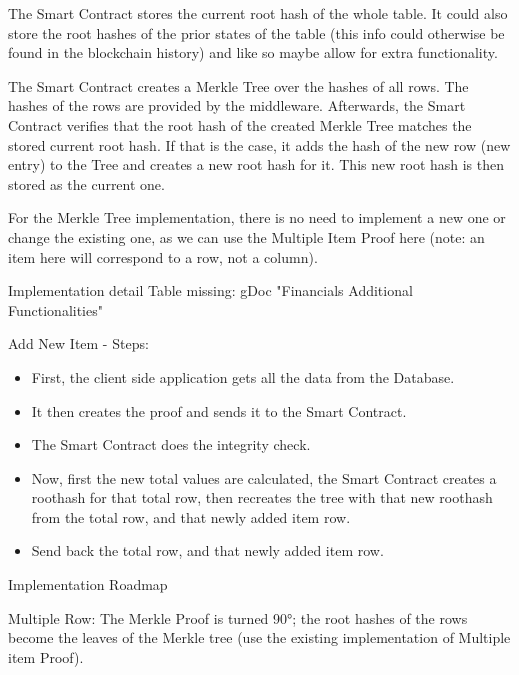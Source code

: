 The Smart Contract stores the current root hash of the whole table. It could also store the root hashes of the prior states of the table (this info could otherwise be found in the blockchain history) and like so maybe allow for extra functionality.

The Smart Contract creates a Merkle Tree over the hashes of all rows. The hashes of the rows are provided by the middleware. Afterwards, the Smart Contract verifies that the root hash of the created Merkle Tree matches the stored current root hash. If that is the case, it adds the hash of the new row (new entry) to the Tree and creates a new root hash for it. This new root hash is then stored as the current one.

For the Merkle Tree implementation, there is no need to implement a new one or change the existing one, as we can use the Multiple Item Proof here (note: an item here will correspond to a row, not a column).

Implementation detail
Table missing: gDoc "Financials Additional Functionalities"

Add New Item - Steps:
\begin{itemize}
\item First, the client side application gets all the data from the Database.
\item It then creates the proof and sends it to the Smart Contract.
\item The Smart Contract does the integrity check.
\item Now, first the new total values are calculated, the Smart Contract creates a roothash for that total row, then recreates the tree with that new roothash from the total row, and that newly added item row.
\item Send back the total row, and that newly added item row.
\end{itemize}

Implementation Roadmap

Multiple Row:
The Merkle Proof is turned 90°; the root hashes of the rows become the leaves of the Merkle tree (use the existing implementation of Multiple item Proof).

